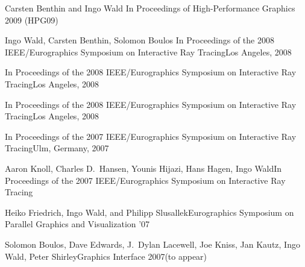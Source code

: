 \documentclass[letterpaper,11pt]{moderncv}
\begin{document}
 {Carsten Benthin and Ingo Wald}
{In 
Proceedings of High-Performance Graphics 2009 (HPG09)}{}


{
Ingo Wald, Carsten Benthin, Solomon Boulos
} {In Proceedings of the 2008
  IEEE/Eurographics Symposium on Interactive Ray Tracing}{Los Angeles, 2008}

 {In Proceedings of the 2008
  IEEE/Eurographics Symposium on Interactive Ray Tracing}{Los Angeles, 2008}

 {In Proceedings of the 2008
  IEEE/Eurographics Symposium on Interactive Ray Tracing}{Los Angeles, 2008}

 {In Proceedings of the 2007
  IEEE/Eurographics Symposium on Interactive Ray Tracing}{Ulm,
  Germany, 2007}


{Aaron Knoll, Charles D.\ Hansen, Younis Hijazi, Hans Hagen, \und Ingo Wald}{In Proceedings of the 2007 IEEE/Eurographics Symposium on Interactive
    Ray Tracing}{}


{Heiko Friedrich, Ingo Wald, and Philipp Slusallek}{Eurographics Symposium on Parallel Graphics and
    Visualization '07}{}


{Solomon Boulos, Dave Edwards, J.\ Dylan Lacewell, Joe Kniss, Jan Kautz,
  Ingo Wald, \und   Peter Shirley}{Graphics Interface 2007}{(to appear)}
\end{document}
